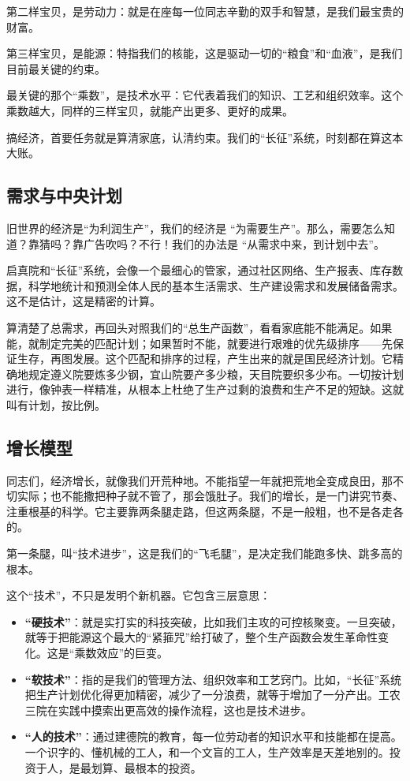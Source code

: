 第二样宝贝，是劳动力：就是在座每一位同志辛勤的双手和智慧，是我们最宝贵的财富。

第三样宝贝，是能源：特指我们的核能，这是驱动一切的``粮食''和``血液''，是我们目前最关键的约束。

最关键的那个``乘数''，是技术水平：它代表着我们的知识、工艺和组织效率。这个乘数越大，同样的三样宝贝，就能产出更多、更好的成果。

搞经济，首要任务就是算清家底，认清约束。我们的``长征''系统，时刻都在算这本大账。

\subsection{需求与中央计划}\label{ux9700ux6c42ux4e0eux4e2dux592eux8ba1ux5212}

旧世界的经济是``为利润生产''，我们的经济是 ``为需要生产''。那么，需要怎么知道？靠猜吗？靠广告吹吗？不行！我们的办法是 ``从需求中来，到计划中去''。

启真院和``长征''系统，会像一个最细心的管家，通过社区网络、生产报表、库存数据，科学地统计和预测全体人民的基本生活需求、生产建设需求和发展储备需求。这不是估计，这是精密的计算。

算清楚了总需求，再回头对照我们的``总生产函数''，看看家底能不能满足。如果能，就制定完美的匹配计划；如果暂时不能，就要进行艰难的优先级排序------先保证生存，再图发展。这个匹配和排序的过程，产生出来的就是国民经济计划。它精确地规定遵义院要炼多少钢，宜山院要产多少粮，天目院要织多少布。一切按计划进行，像钟表一样精准，从根本上杜绝了生产过剩的浪费和生产不足的短缺。这就叫有计划，按比例。

\subsection{增长模型}\label{ux589eux957fux6a21ux578b}

同志们，经济增长，就像我们开荒种地。不能指望一年就把荒地全变成良田，那不切实际；也不能撒把种子就不管了，那会饿肚子。我们的增长，是一门讲究节奏、注重根基的科学。它主要靠两条腿走路，但这两条腿，不是一般粗，也不是各走各的。

第一条腿，叫``技术进步''，这是我们的``飞毛腿''，是决定我们能跑多快、跳多高的根本。

这个``技术''，不只是发明个新机器。它包含三层意思：

\begin{itemize}
\item
  \textbf{``硬技术''}：就是实打实的科技突破，比如我们主攻的可控核聚变。一旦突破，就等于把能源这个最大的``紧箍咒''给打破了，整个生产函数会发生革命性变化。这是``乘数效应''的巨变。
\item
  \textbf{``软技术''}：指的是我们的管理方法、组织效率和工艺窍门。比如，``长征''系统把生产计划优化得更加精密，减少了一分浪费，就等于增加了一分产出。工农三院在实践中摸索出更高效的操作流程，这也是技术进步。
\item
  \textbf{``人的技术''}：通过建德院的教育，每一位劳动者的知识水平和技能都在提高。一个识字的、懂机械的工人，和一个文盲的工人，生产效率是天差地别的。投资于人，是最划算、最根本的投资。
\end{itemize}

